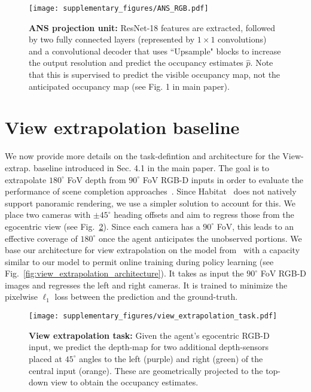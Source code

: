 \documentclass[runningheads]{llncs}
\begin{document}
\begin{figure}[ht!]
    \centering
    \texttt{[image: supplementary\_figures/ANS\_RGB.pdf]}
    \caption{\small \textbf{ANS projection unit:} ResNet-18 features are extracted, followed by two fully connected layers (represented by $1\times 1$ convolutions) and a convolutional decoder that uses ``Upsample" blocks to increase the output resolution and predict the occupancy estimates $\hat{p}$. Note that this is supervised to predict the visible occupancy map, not the anticipated occupancy map (see Fig. 1 in main paper).}
    \label{fig:ans_projection_unit}
\end{figure}


\section{View extrapolation baseline}
\label{sec:view_extrapolation_baseline}
We now provide more details on the task-defintion and architecture for the View-extrap. baseline introduced in Sec. 4.1 in the main paper. The goal is to extrapolate $180^\circ$ FoV depth from $90^\circ$ FoV RGB-D inputs in order to evaluate the performance of scene completion approaches~\cite{song2018im2pano3d,Yang_2019_CVPR}. Since Habitat~\cite{habitat19iccv} does not natively support panoramic rendering, we use a simpler solution to account for this. We place two cameras with $\pm45^\circ$ heading offsets and aim to regress those from the egocentric view (see Fig.~\ref{fig:view_extrapolation_task}). Since each camera has a $90^{\circ}$ FoV, this leads to an effective coverage of $180^{\circ}$ once the agent anticipates the unobserved portions. We base our architecture for view extrapolation on the model from~\cite{Yang_2019_CVPR} with a capacity similar to our model to permit online training during policy learning (see Fig.~\ref{fig:view_extrapolation_architecture}). It takes as input the $90^\circ$ FoV RGB-D images and regresses the left and right cameras. It is trained to minimize the pixelwise $\ell_{1}$ loss between the prediction and the ground-truth.

\begin{figure}[ht!]
    \centering
    \texttt{[image: supplementary\_figures/view\_extrapolation\_task.pdf]}
    \caption{\small \textbf{View extrapolation task:} Given the agent's egocentric RGB-D input, we predict the depth-map for two additional depth-sensors placed at $45^{\circ}$ angles to the left (purple) and right (green) of the central input (orange). These are geometrically projected to the top-down view to obtain the occupancy estimates.}
    \label{fig:view_extrapolation_task}
\end{figure}
\end{document}
